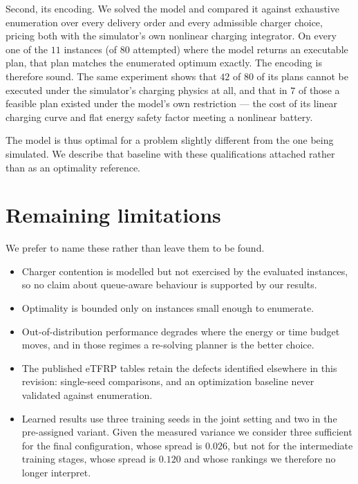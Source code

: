 \documentclass[11pt]{article}
\begin{document}
Second, its encoding. We solved the model and compared it against exhaustive
enumeration over every delivery order and every admissible charger choice,
pricing both with the simulator's own nonlinear charging integrator. On every
one of the $11$ instances (of $80$ attempted) where the model returns an
executable plan, that plan matches the enumerated optimum exactly. The encoding
is therefore sound. The same experiment shows that $42$ of $80$ of its plans
cannot be executed under the simulator's charging physics at all, and that in
$7$ of those a feasible plan existed under the model's own restriction --- the
cost of its linear charging curve and flat energy safety factor meeting a
nonlinear battery.

The model is thus optimal for a problem slightly different from the one being
simulated. We describe that baseline with these qualifications attached rather
than as an optimality reference.

\section*{Remaining limitations}

We prefer to name these rather than leave them to be found.
\begin{itemize}[leftmargin=*,nosep]
\item Charger contention is modelled but not exercised by the evaluated
instances, so no claim about queue-aware behaviour is supported by our results.
\item Optimality is bounded only on instances small enough to enumerate.
\item Out-of-distribution performance degrades where the energy or time budget
moves, and in those regimes a re-solving planner is the better choice.
\item The published eTFRP tables retain the defects identified elsewhere in
this revision: single-seed comparisons, and an optimization baseline never
validated against enumeration.
\item Learned results use three training seeds in the joint setting and two in
the pre-assigned variant. Given the measured variance we
consider three sufficient for the final configuration, whose spread is $0.026$,
but not for the intermediate training stages, whose spread is $0.120$ and whose
rankings we therefore no longer interpret.
\end{itemize}
\end{document}
